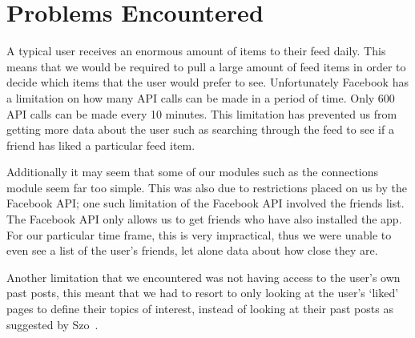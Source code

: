 \newpage
\section{Problems Encountered}

A typical user receives an enormous amount of items to their feed daily. This means that we would be required to pull a large amount of feed items in order to decide which items that the user would prefer to see. Unfortunately Facebook has a limitation on how many API calls can be made in a period of time. Only 600 API calls can be made every 10 minutes. This limitation has prevented us from getting more data about the user such as searching through the feed to see if a friend has liked a particular feed item.

Additionally it may seem that some of our modules such as the connections module seem far too simple. This was also due to restrictions placed on us by the Facebook API; one such limitation of the Facebook API involved the friends list. The Facebook API only allows us to get friends who have also installed the app. For our particular time frame, this is very impractical, thus we were unable to even see a list of the user's friends, let alone data about how close they are.

Another limitation that we encountered was not having access to the user’s own past posts, this meant that we had to resort to only looking at the user’s ‘liked’ pages to define their topics of interest, instead of looking at their past posts as suggested by Szo~\cite{szomszor2008semantic}.